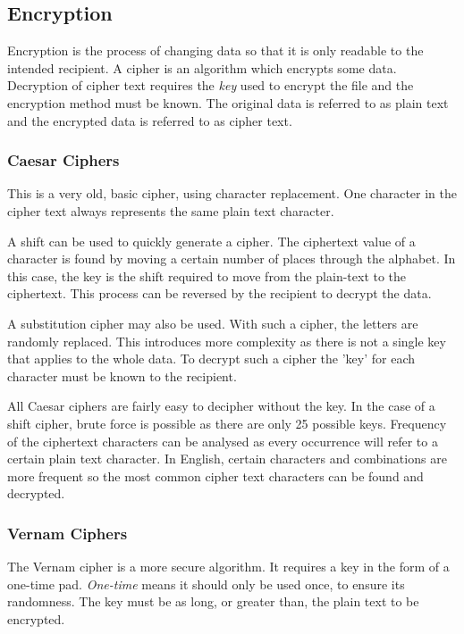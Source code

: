 \documentclass[9pt]{article}
\begin{document}
\subsection{Encryption}
\label{sec:org6d7ae9f}

Encryption is the process of changing data so that it is only readable to the intended recipient. A cipher is an algorithm which encrypts some data. Decryption of cipher text requires the \emph{key} used to encrypt the file and the encryption method must be known. The original data is referred to as plain text and the encrypted data is referred to as cipher text.

\subsubsection{Caesar Ciphers}
\label{sec:org2fe4cad}

This is a very old, basic cipher, using character replacement. One character in the cipher text always represents the same plain text character.

A shift can be used to quickly generate a cipher. The ciphertext value of a character is found by moving a certain number of places through the alphabet. In this case, the key is the shift required to move from the plain-text to the ciphertext. This process can be reversed by the recipient to decrypt the data.

A substitution cipher may also be used. With such a cipher, the letters are randomly replaced. This introduces more complexity as there is not a single key that applies to the whole data. To decrypt such a cipher the 'key' for each character must be known to the recipient.

All Caesar ciphers are fairly easy to decipher without the key. In the case of a shift cipher, brute force is possible as there are only 25 possible keys. Frequency of the ciphertext characters can be analysed as every occurrence will refer to a certain plain text character. In English, certain characters and combinations are more frequent so the most common cipher text characters can be found and decrypted.

\subsubsection{Vernam Ciphers}
\label{sec:org8dbe7f3}

The Vernam cipher is a more secure algorithm. It requires a key in the form of a one-time pad. \emph{One-time} means it should only be used once, to ensure its randomness. The key must be as long, or greater than, the plain text to be encrypted.
\end{document}
